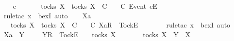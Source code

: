 \begin{isabellebody}
\isanewline
\ \ \isamarkupfalse%
\ e\ {\isasymsigma}{\isacharprime}\isanewline
\ \ \isamarkupfalse%
\ {\isachardoublequoteopen}{\isacharbrackleft}{\isacharbrackright}\ {\isasymin}\ tocks\ X\ {\isasymLongrightarrow}\ {\isasymexists}{\isasymrho}{\isacharprime}{\isasymin}tocks\ X{\isachardot}\ {\isasymrho}{\isacharprime}\ {\isasymsubseteq}\isactrlsub C\ {\isacharbrackleft}{\isacharbrackright}\ {\isasymand}\ {\isasymrho}{\isacharprime}\ {\isasymle}\isactrlsub C\ {\isacharbrackleft}Event\ e{\isacharbrackright}\isactrlsub E\ {\isacharhash}\ {\isasymsigma}{\isacharprime}{\isachardoublequoteclose}\isanewline
\ \ \ \ \isamarkupfalse%
\ {\isacharparenleft}rule{\isacharunderscore}tac\ x{\isacharequal}{\isachardoublequoteopen}{\isacharbrackleft}{\isacharbrackright}{\isachardoublequoteclose}\ \ bexI{\isacharcomma}\ auto{\isacharparenright}\isanewline
{}\isamarkupfalse%
\isanewline
\ \ \isamarkupfalse%
\ Xa\ {\isasymsigma}{\isacharprime}\isanewline
\ \ \isamarkupfalse%
\ {\isachardoublequoteopen}{\isacharbrackleft}{\isacharbrackright}\ {\isasymin}\ tocks\ X\ {\isasymLongrightarrow}\ {\isasymexists}{\isasymrho}{\isacharprime}{\isasymin}tocks\ X{\isachardot}\ {\isasymrho}{\isacharprime}\ {\isasymsubseteq}\isactrlsub C\ {\isacharbrackleft}{\isacharbrackright}\ {\isasymand}\ {\isasymrho}{\isacharprime}\ {\isasymle}\isactrlsub C\ {\isacharbrackleft}Xa{\isacharbrackright}\isactrlsub R\ {\isacharhash}\ {\isacharbrackleft}Tock{\isacharbrackright}\isactrlsub E\ {\isacharhash}\ {\isasymsigma}{\isacharprime}{\isachardoublequoteclose}\isanewline
\ \ \ \ \isamarkupfalse%
\ {\isacharparenleft}rule{\isacharunderscore}tac\ x{\isacharequal}{\isachardoublequoteopen}{\isacharbrackleft}{\isacharbrackright}{\isachardoublequoteclose}\ \ bexI{\isacharcomma}\ auto{\isacharparenright}\isanewline
{}\isamarkupfalse%
\isanewline
\ \ \isamarkupfalse%
\ Xa\ {\isasymrho}\ Y\ {\isasymsigma}{\isacharprime}\isanewline
\ \ \isamarkupfalse%
\ {\isachardoublequoteopen}{\isacharbrackleft}Y{\isacharbrackright}\isactrlsub R\ {\isacharhash}\ {\isacharbrackleft}Tock{\isacharbrackright}\isactrlsub E\ {\isacharhash}\ {\isasymsigma}{\isacharprime}\ {\isasymin}\ tocks\ X{\isachardoublequoteclose}\isanewline
\ \ \isamarkupfalse%
\ \isamarkupfalse%
\ {\isachardoublequoteopen}{\isasymsigma}{\isacharprime}\ {\isasymin}\ tocks\ X\ {\isasymand}\ Y\ {\isasymsubseteq}\ X{\isachardoublequoteclose}\isanewline

\end{isabellebody}
